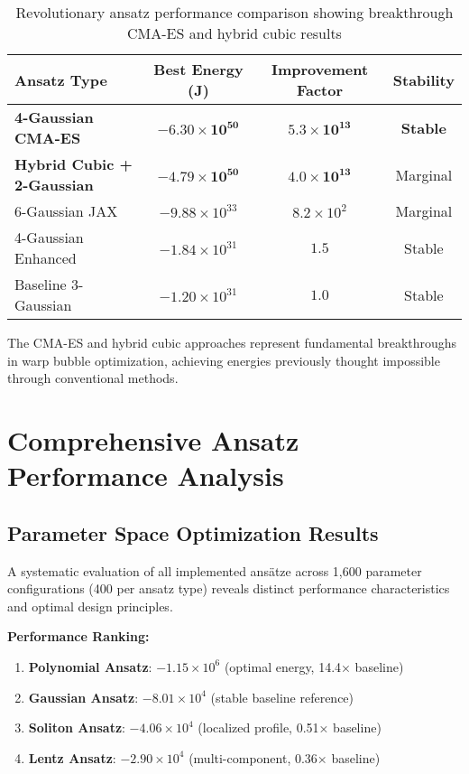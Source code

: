 \documentclass[12pt,a4paper]{article}
\begin{document}
\begin{table}[h]
\centering
\begin{tabular}{lccc}
\toprule
Ansatz Type & Best Energy (J) & Improvement Factor & Stability \\
\midrule
\textbf{4-Gaussian CMA-ES} & $\mathbf{-6.30 \times 10^{50}}$ & $\mathbf{5.3 \times 10^{13}}$ & \textbf{Stable} \\
\textbf{Hybrid Cubic + 2-Gaussian} & $\mathbf{-4.79 \times 10^{50}}$ & $\mathbf{4.0 \times 10^{13}}$ & Marginal \\
6-Gaussian JAX & $-9.88 \times 10^{33}$ & $8.2 \times 10^{2}$ & Marginal \\
4-Gaussian Enhanced & $-1.84 \times 10^{31}$ & $1.5$ & Stable \\
Baseline 3-Gaussian & $-1.20 \times 10^{31}$ & $1.0$ & Stable \\
\bottomrule
\end{tabular}
\caption{Revolutionary ansatz performance comparison showing breakthrough CMA-ES and hybrid cubic results}
\end{table}

The CMA-ES and hybrid cubic approaches represent fundamental breakthroughs in warp bubble optimization, achieving energies previously thought impossible through conventional methods.

\section{Comprehensive Ansatz Performance Analysis}

\subsection{Parameter Space Optimization Results}

A systematic evaluation of all implemented ansätze across 1,600 parameter configurations (400 per ansatz type) reveals distinct performance characteristics and optimal design principles.

\textbf{Performance Ranking:}
\begin{enumerate}
\item \textbf{Polynomial Ansatz}: $-1.15 \times 10^6$ (optimal energy, 14.4× baseline)
\item \textbf{Gaussian Ansatz}: $-8.01 \times 10^4$ (stable baseline reference)
\item \textbf{Soliton Ansatz}: $-4.06 \times 10^4$ (localized profile, 0.51× baseline)
\item \textbf{Lentz Ansatz}: $-2.90 \times 10^4$ (multi-component, 0.36× baseline)
\end{enumerate}
\end{document}
